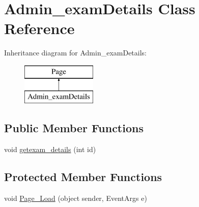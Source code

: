 \hypertarget{class_admin__exam_details}{}\section{Admin\+\_\+exam\+Details Class Reference}
\label{class_admin__exam_details}
Inheritance diagram for Admin\+\_\+exam\+Details\+:\begin{figure}[H]
\begin{center}
\leavevmode
\includegraphics[height=2.000000cm]{class_admin__exam_details}
\end{center}
\end{figure}
\subsection*{Public Member Functions}
\begin{DoxyCompactItemize}
\item 
void \mbox{\hyperlink{class_admin__exam_details_a9cfbc923d62fce62b53e61ce1796c97a}{getexam\+\_\+details}} (int id)
\end{DoxyCompactItemize}
\subsection*{Protected Member Functions}
\begin{DoxyCompactItemize}
\item 
void \mbox{\hyperlink{class_admin__exam_details_ad014a034b0275bc06c370cb1237510a3}{Page\+\_\+\+Load}} (object sender, Event\+Args e)
\end{DoxyCompactItemize}

